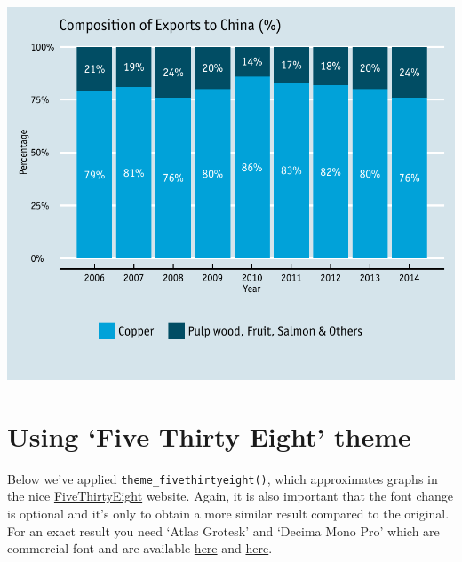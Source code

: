 \begin{center}\includegraphics[width=0.6\linewidth]{4_Stacked_Bar_pdf/stacked_11-1} \end{center}

\section{\texorpdfstring{Using `Five Thirty Eight'
theme}{Using Five Thirty Eight theme}}\label{using-five-thirty-eight-theme}

Below we've applied \texttt{theme\_fivethirtyeight()}, which
approximates graphs in the nice
\href{http://fivethirtyeight.com/}{FiveThirtyEight} website. Again, it
is also important that the font change is optional and it's only to
obtain a more similar result compared to the original. For an exact
result you need `Atlas Grotesk' and `Decima Mono Pro' which are
commercial font and are available
\href{https://commercialtype.com/catalog/atlas}{here} and
\href{https://www.myfonts.com/fonts/tipografiaramis/decima-mono-pro/}{here}.

